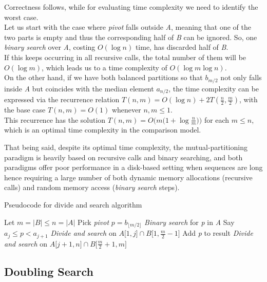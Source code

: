 Correctness follows, while for evaluating time complexity we need to identify the worst case. \\
Let us start with the case where \textit{pivot} falls outside \textit{A}, meaning that one of the two parts is empty and thus the corresponding half of \textit{B} can be ignored. So, one \textit{binary search}  over \textit{A}, costing $O(\log n)$ time, has discarded half of \textit{B}.\\
If this keeps occurring in all recursive calls, the total number of them will be $O(\log m)$, which leads us to a time complexity of $O(\log m \log n)$.\\
On the other hand, if we have both balanced partitions so that $b_{m/2}$ not only falls inside \textit{A} but coincides with the median element $a_{n/2}$, the time complexity can be expressed via the recurrence relation $T(n, m) = O(\log n) + 2T \left(\frac{n}{2}, \frac{m}{2}\right)$, with the base case $T(n,m)=O(1)$ whenever $n,m \leq 1$.\\
This recurrence has the solution $T(n,m)=O \big(m \big(1+\log \frac{n}{m}\big)\big)$ for each $m \leq n$, which is an optimal time complexity in the comparison model.

That being said, despite its optimal time complexity, the mutual-partitioning paradigm is heavily based on recursive calls and binary searching, and both paradigms offer poor performance in a disk-based setting when sequences are long hence requiring a large number of both dynamic memory allocations (recursive calls) and random memory access (\textit{binary search} steps).

\begin{algorithm}
    \captionsetup{labelsep=newline}
    \caption{Pseudocode for divide and search algorithm \label{alg:divandsearch}}
    \begin{algorithmic}[1]
        \State Let $m=|B| \leq n=|A|$
        \State Pick \textit{pivot} $p=b_{\lfloor m/2 \rfloor}$
        \State \textit{Binary search} for \textit{p} in \textit{A} \Comment Say $a_j \leq p < a_{j+1}$
        \State \textit{Divide and search} on $A\big[1, j\big] \cap B\big[1, \frac{m}{2}-1\big]$
            \State Add \textit{p} to result
        \EndIf
        \State \textit{Divide and search} on $A\big[ j+1, n\big] \cap B\big[\frac{m}{2}+1, m\big]$
    \end{algorithmic}
\end{algorithm}

\subsection{Doubling Search \label{galloping}}

